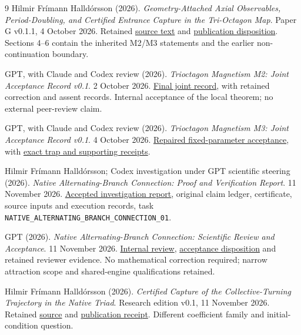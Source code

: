 \begin{thebibliography}{9}
 Hilmir Fr\'imann Halld\'orsson (2026).
\emph{Geometry-Attached Axial Observables, Period-Doubling, and Certified Entrance Capture in the Tri-Octagon Map}.
Paper G v0.1.1, 4 October 2026. Retained \href{evidence/branch/submitted/packet/inputs/paper_g/paper_g.tex}{source text} and \href{evidence/branch/submitted/sources/PAPER_G_README.md}{publication disposition}. Sections 4--6 contain the inherited M2/M3 statements and the earlier non-continuation boundary.

 GPT, with Claude and Codex review (2026).
\emph{Trioctagon Magnetism M2: Joint Acceptance Record v0.1}.
2 October 2026. \href{evidence/branch/submitted/sources/M2_JOINT_ACCEPTANCE.md}{Final joint record}, with retained correction and assent records. Internal acceptance of the local theorem; no external peer-review claim.

 GPT, with Claude and Codex review (2026).
\emph{Trioctagon Magnetism M3: Joint Acceptance Record v0.1}.
4 October 2026. \href{evidence/branch/submitted/packet/inputs/paper_g/M3_JOINT_ACCEPTANCE.md}{Repaired fixed-parameter acceptance}, with \href{evidence/branch/submitted/sources/m3_accepted_support.json}{exact trap and supporting receipts}.

 Hilmir Fr\'imann Halld\'orsson; Codex investigation under GPT scientific steering (2026).
\emph{Native Alternating-Branch Connection: Proof and Verification Report}.
11 November 2026. \href{evidence/branch/submitted/PROOF_REPORT.md}{Accepted investigation report}, original claim ledger, certificate, source inputs and execution records, task \texttt{NATIVE\_ALTERNATING\_BRANCH\_CONNECTION\_01}.

 GPT (2026).
\emph{Native Alternating-Branch Connection: Scientific Review and Acceptance}.
11 November 2026. \href{evidence/branch/NATIVE_ALTERNATING_BRANCH_CONNECTION_01_GPT_REVIEW.md}{Internal review}, \href{evidence/branch/GPT_ACCEPTANCE.json}{acceptance disposition} and retained reviewer evidence. No mathematical correction required; narrow attraction scope and shared-engine qualifications retained.

 Hilmir Fr\'imann Halld\'orsson (2026).
\emph{Certified Capture of the Collective-Turning Trajectory in the Native Triad}.
Research edition v0.1, 11 November 2026. Retained \href{evidence/branch/submitted/packet/inputs/current/CAPTURE_COMPANION_main.tex}{source} and \href{evidence/branch/submitted/packet/inputs/current/CAPTURE_PUBLICATION_RECEIPT.json}{publication receipt}. Different coefficient family and initial-condition question.
\end{thebibliography}
